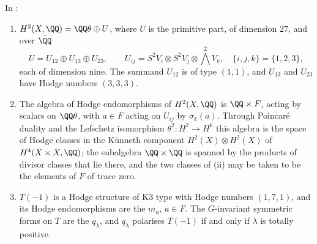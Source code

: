 \begin{proposition}%
\label{prop:mumfordrm}
In :
\begin{enumerate}[label=\textup{(\roman*)},nosep,leftmargin=2.6em]
\item $H^{2}(X,\QQ)=\QQ\theta\oplus U$, where $U$ is the primitive part, of
  dimension $27$, and over $\bar{\QQ}$
  \[
    U=U_{12}\oplus U_{13}\oplus U_{23},\qquad
    U_{ij}=S^{2}V_{i}\otimes S^{2}V_{j}\otimes{\textstyle\bigwedge^{2}}V_{k},
    \quad \{i,j,k\}=\{1,2,3\},
  \]
  each of dimension nine. The summand $U_{12}$ is of type $(1,1)$, and
  $U_{13}$ and $U_{23}$ have Hodge numbers $(3,3,3)$.
\item The algebra of Hodge endomorphisms of $H^{2}(X,\QQ)$ is $\QQ\times F$,
  acting by scalars on $\QQ\theta$, with $a\in F$ acting on $U_{ij}$ by
  $\sigma_{k}(a)$. Through Poincar\'e duality and the Lefschetz isomorphism
  $\theta^{2}\colon H^{2}\to H^{6}$ this algebra is the space of Hodge classes
  in the K\"unneth component $H^{2}(X)\otimes H^{2}(X)$ of
  $H^{4}(X\times X,\QQ)$; the subalgebra $\QQ\times\QQ$ is spanned by the
  products of divisor classes that lie there, and the two classes of
  (ii) may be taken to be the elements of $F$ of
  trace zero.
\item $T(-1)$ is a Hodge structure of K3 type with Hodge numbers $(1,7,1)$,
  and its Hodge endomorphisms are the $m_{a}$, $a\in F$. The $G$-invariant
  symmetric forms on $T$ are the $q_{\lambda}$, and $q_{\lambda}$ polarises
  $T(-1)$ if and only if $\lambda$ is totally positive.
\end{enumerate}
\end{proposition}

